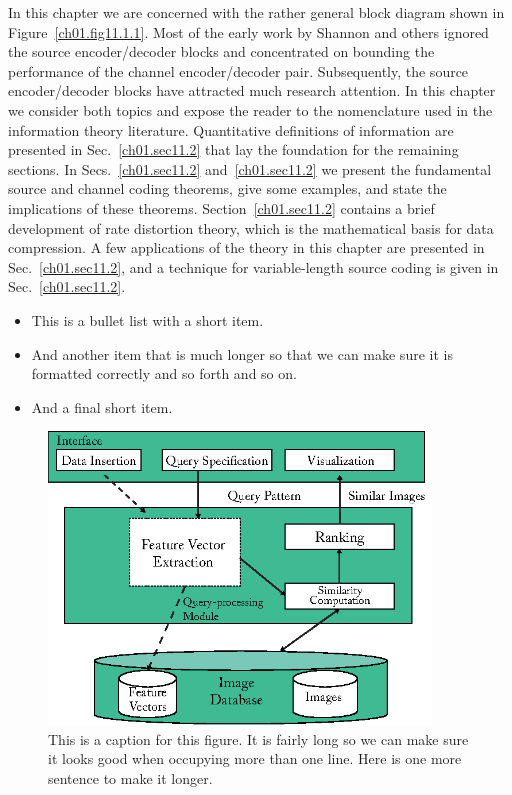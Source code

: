 \noindent In this chapter we are concerned with the rather general block diagram
shown in Figure~\ref{ch01.fig11.1.1}. Most of the early work by
Shannon and others ignored the source  encoder/decoder blocks and
concentrated  on bounding the performance of the channel
encoder/decoder pair. Subsequently, the source  encoder/decoder blocks
have attracted much research attention.  In this chapter we consider
both topics and expose the reader to the nomenclature used in the
information theory literature.
Quantitative definitions of information are presented in
Sec.~\ref{ch01.sec11.2} that lay the foundation for the remaining
sections. In Secs.~\ref{ch01.sec11.2} and~\ref{ch01.sec11.2} we present
the fundamental source and channel coding theorems, give some examples,
and state the implications of these theorems.
Section~\ref{ch01.sec11.2} contains a brief development of rate
distortion theory,
which is the mathematical basis for data compression.
A few applications of the theory in this chapter are presented
in Sec.~\ref{ch01.sec11.2}, and a technique for variable-length
source coding is given in Sec.~\ref{ch01.sec11.2}.
\begin{itemize}
\item This is a bullet list with a short item.
\item And another item that is much longer so that we can make sure it is
formatted correctly and so forth and so on.
\item And a final short item.
\end{itemize}

\begin{figure}
\includegraphics[width=24pc]{sample-figure}
\caption{This is a caption for this figure. It is fairly long so we can make
sure it looks good when occupying more than one line. Here is one more
sentence to make it longer.}
\label{ch01.fig11.1.1}
\label{fig:query-specification}
\end{figure}

